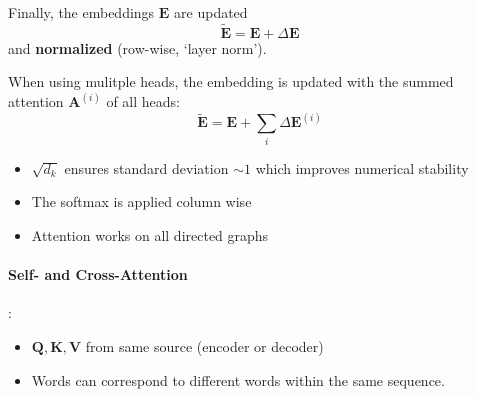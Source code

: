 Finally, the embeddings $\mathbf{E}$ are updated
\noindent\begin{equation*}
    \tilde{\mathbf{E}} = \mathbf{E} + \Delta \mathbf{E} %
\end{equation*}
and \textbf{normalized} (row-wise, `layer norm').

\newpar{}

When using mulitple heads, the embedding is updated with the summed attention $\mathbf{A}^{(i)}$ of all heads:
\noindent\begin{equation*}
    \tilde{\mathbf{E}} = \mathbf{E} + \sum_i \Delta \mathbf{E}^{(i)} %
\end{equation*}

\begin{itemize}
    \item $\sqrt{d_k}$ ensures standard deviation $\sim 1$ which improves numerical stability
    \item The softmax is applied column wise
    \item Attention works on all directed graphs
\end{itemize}

\paragraph{Self- and Cross-Attention}

:

\begin{itemize}
    \item $\mathbf{Q,K,V}$ from same source (encoder or decoder)
    \item Words can correspond to different words within the same sequence.
\end{itemize}

